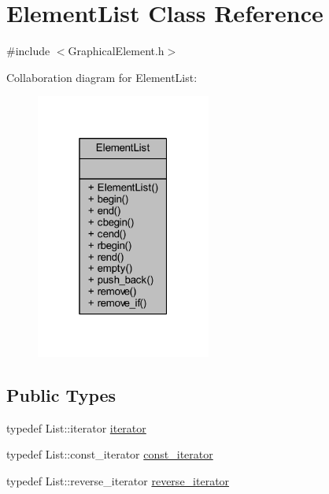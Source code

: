 \hypertarget{class_element_list}{}\section{Element\+List Class Reference}
\label{class_element_list}


{\ttfamily \#include $<$Graphical\+Element.\+h$>$}



Collaboration diagram for Element\+List\+:
\nopagebreak
\begin{figure}[H]
\begin{center}
\leavevmode
\includegraphics[width=163pt]{class_element_list__coll__graph}
\end{center}
\end{figure}
\subsection*{Public Types}
\begin{DoxyCompactItemize}
\item 
typedef List\+::iterator \hyperlink{class_element_list_a10e1b0c17ebe441fcd035fcf0a00d25e}{iterator}
\item 
typedef List\+::const\+\_\+iterator \hyperlink{class_element_list_a4323074a8e979322c0bf1eed5c892cf4}{const\+\_\+iterator}
\item 
typedef List\+::reverse\+\_\+iterator \hyperlink{class_element_list_a5a94d1e25a0deeb3f222dc12fa115174}{reverse\+\_\+iterator}
\end{DoxyCompactItemize}
